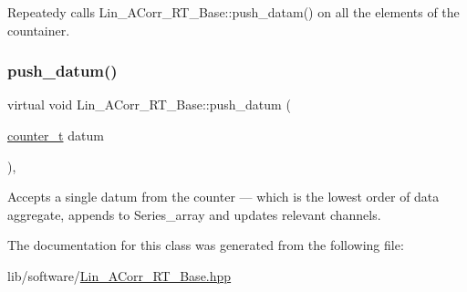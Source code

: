 Repeatedy calls {\ttfamily Lin\+\_\+\+A\+Corr\+\_\+\+R\+T\+\_\+\+Base\+::push\+\_\+datam()} on all the elements of the countainer. 

\mbox{\label{classLin__ACorr__RT__Base_a398167525faf2a65f29722e943a0c57e}} 
\subsubsection{\texorpdfstring{push\+\_\+datum()}{push\_datum()}}
{\footnotesize\ttfamily virtual void Lin\+\_\+\+A\+Corr\+\_\+\+R\+T\+\_\+\+Base\+::push\+\_\+datum (\begin{DoxyParamCaption}\item[{\hyperlink{types_8hpp_ac89ac912f524b3e3fa3720ea55fec966}{counter\+\_\+t}}]{datum }\end{DoxyParamCaption})\hspace{0.3cm}{\ttfamily [inline]}, {}}



Accepts a single {\ttfamily datum} from the counter — which is the lowest order of data aggregate, appends to Series\+\_\+array and updates relevant channels. 



The documentation for this class was generated from the following file\+:\begin{DoxyCompactItemize}
\item 
lib/software/\hyperlink{Lin__ACorr__RT__Base_8hpp}{Lin\+\_\+\+A\+Corr\+\_\+\+R\+T\+\_\+\+Base.\+hpp}\end{DoxyCompactItemize}
